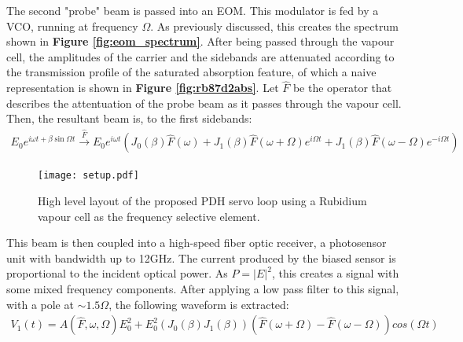 The second "probe" beam is passed into an EOM.  This modulator is fed by a VCO,
running at frequency $\Omega$. As previously discussed, this creates the spectrum
shown in \textbf{Figure \ref{fig:eom_spectrum}}. After being passed through the
vapour cell, the amplitudes of the carrier and the sidebands are attenuated
according to the transmission profile of the saturated absorption feature,
of which a naive representation is shown in
\textbf{Figure \ref{fig:rb87d2abs}}. Let $\hat{F}$ be the operator that
describes the attentuation of the probe beam as it passes through the
vapour cell. Then, the resultant beam is, to the first sidebands:
\begin{gather}
  E_0 e^{i \omega t + \beta \sin \Omega t} \xrightarrow{\hat{F}}
    E_0e^{i \omega t }\left( J_0(\beta)\hat{F}(\omega) +
      J_1(\beta)\hat{F}(\omega + \Omega)e^{i\Omega t} +
        J_1(\beta)\hat{F}(\omega - \Omega)e^{-i\Omega t} \right)
\end{gather}

\begin{figure}
  \centering
  \texttt{[image: setup.pdf]}
  \caption{High level layout of the proposed PDH servo loop using a Rubidium
   vapour cell as the frequency selective element.}
    \label{fig:setup}
\end{figure}

This beam is then coupled into a high-speed fiber optic receiver, a
photosensor unit with bandwidth up to 12GHz. The current produced by the
biased sensor is proportional to the incident optical power. As
$P = |E|^2$, this creates a signal with some mixed frequency components. After
applying a low pass filter to this signal, with a pole at $\sim 1.5 \Omega$,
the following waveform is extracted:
\begin{gather}
  V_1(t) = A(\hat{F}, \omega, \Omega) E_0^2 +
    E_0^2 (J_0(\beta)J_1(\beta))
    (\hat{F}(\omega + \Omega) - \hat{F}(\omega - \Omega))cos(\Omega t)
\end{gather}

